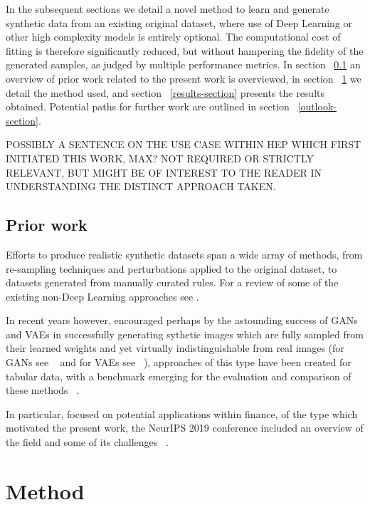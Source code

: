 \documentclass{article}
\begin{document}
In the subsequent sections we detail a novel method to learn and generate synthetic data from an existing original dataset, where use of Deep Learning or other high complexity models is entirely optional. The computational cost of fitting is therefore significantly reduced, but without hampering the fidelity of the generated samples, as judged by multiple performance metrics. In section ~\ref{prior-work-section} an overview of prior work related to the present work is overviewed, in section ~\ref{method-section} we detail the method used, and section ~\ref{results-section} presents the results obtained. Potential paths for further work are outlined in section ~\ref{outlook-section}.

POSSIBLY A SENTENCE ON THE USE CASE WITHIN HEP WHICH FIRST INITIATED THIS WORK, MAX? NOT REQUIRED OR STRICTLY RELEVANT, BUT MIGHT BE OF INTEREST TO THE READER IN UNDERSTANDING THE DISTINCT APPROACH TAKEN.


\subsection{Prior work}
\label{prior-work-section}

Efforts to produce realistic synthetic datasets span a wide array of methods, from re-sampling techniques and perturbations applied to the original dataset, to datasets generated from manually curated rules. For a review of some of the existing non-Deep Learning approaches see \cite{surendra2017review}.

In recent years however, encouraged perhaps by the astounding success of GANs and VAEs in successfully generating sythetic images which are fully sampled from their learned weights and yet virtually indistinguishable from real images (for GANs see ~\cite{karras2020analyzing} and for VAEs see ~\cite{razavi2019generating}), approaches of this type have been created for tabular data, with a benchmark emerging for the evaluation and comparison of these methods ~\cite{xu2019modeling}.

In particular, focused on potential applications within finance, of the type which motivated the present work, the NeurIPS 2019 conference included an overview of the field and some of its challenges ~\cite{assefa2020generating}.


\section{Method}
\label{method-section}
\end{document}
